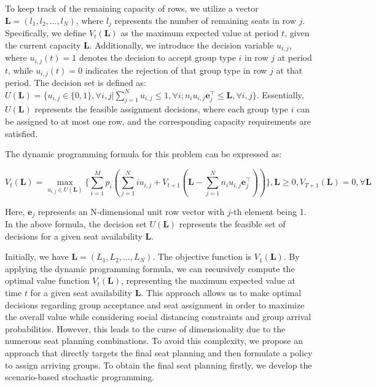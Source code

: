 To keep track of the remaining capacity of rows, we utilize a vector $\mathbf{L} = (l_1, l_2, \ldots, l_N)$, where $l_j$ represents the number of remaining seats in row $j$. Specifically, we define $V_t(\mathbf{L})$ as the maximum expected value at period $t$, given the current capacity $\mathbf{L}$. Additionally, we introduce the decision variable $u_{i,j}$, where $u_{i,j}(t) = 1$ denotes the decision to accept group type $i$ in row $j$ at period $t$, while $u_{i,j}(t) = 0$ indicates the rejection of that group type in row $j$ at that period. The decision set is defined as: $U(\mathbf{L}) = \{u_{i,j} \in\{0,1\}, \forall i,j| \sum_{j=1}^{N} u_{i,j} \leq 1, \forall i; n_{i}u_{i,j}\mathbf{e}_j^{\top} \leq \mathbf{L}, \forall i,j \}$. Essentially, $U(\mathbf{L})$ represents the feasible assignment decisions, where each group type $i$ can be assigned to at most one row, and the corresponding capacity requirements are satisfied.

The dynamic programming formula for this problem can be expressed as:

$$V_{t}(\mathbf{L}) = \max_{u_{i,j} \in U(\mathbf{L})}\{ \sum_{i=1}^{M} p_i ( \sum_{j=1}^{N} i u_{i,j} + V_{t+1}(\mathbf{L}- \sum_{j=1}^{N} n_i u_{i,j}\mathbf{e}_j^{\top} ))\}, \mathbf{L} \geq 0, V_{T+1}(\mathbf{L}) =0, \forall \mathbf{L}$$

Here, $\mathbf{e}_j$ represents an N-dimensional unit row vector with $j$-th element being 1. In the above formula, the decision set $U(\mathbf{L})$ represents the feasible set of decisions for a given seat availability $\mathbf{L}$. 

Initially, we have $\mathbf{L} = (L_1, L_2, \ldots, L_{N})$. The objective function is $V_1(\mathbf{L})$. By applying the dynamic programming formula, we can recursively compute the optimal value function $V_t(\mathbf{L})$, representing the maximum expected value at time $t$ for a given seat availability $\mathbf{L}$. This approach allows us to make optimal decisions regarding group acceptance and seat assignment in order to maximize the overall value while considering social distancing constraints and group arrival probabilities. However, this leads to the curse of dimensionality due to the numerous seat planning combinations. To avoid this complexity, we propose an approach that directly targets the final seat planning and then formulate a policy to assign arriving groups. To obtain the final seat planning firstly, we develop the scenario-based stochastic programming.


